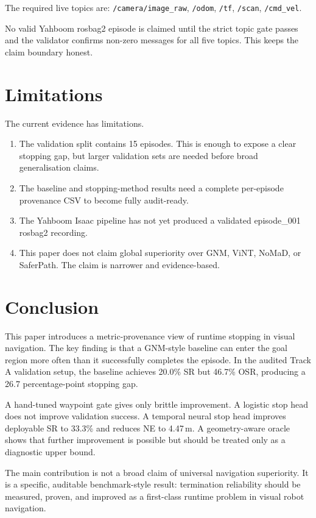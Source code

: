 \documentclass[conference]{IEEEtran}
\begin{document}
The required live topics are: \texttt{/camera/image\_raw}, \texttt{/odom}, \texttt{/tf}, \texttt{/scan}, \texttt{/cmd\_vel}.

No valid Yahboom rosbag2 episode is claimed until the strict topic gate passes and the validator confirms non-zero messages for all five topics. This keeps the claim boundary honest.

\section{Limitations}

The current evidence has limitations.
\begin{enumerate}
    \item The validation split contains 15 episodes. This is enough to expose a clear stopping gap, but larger validation sets are needed before broad generalisation claims.
    \item The baseline and stopping-method results need a complete per-episode provenance CSV to become fully audit-ready.
    \item The Yahboom Isaac pipeline has not yet produced a validated episode\_001 rosbag2 recording.
    \item This paper does not claim global superiority over GNM, ViNT, NoMaD, or SaferPath. The claim is narrower and evidence-based.
\end{enumerate}

\section{Conclusion}

This paper introduces a metric-provenance view of runtime stopping in visual navigation. The key finding is that a GNM-style baseline can enter the goal region more often than it successfully completes the episode. In the audited Track A validation setup, the baseline achieves 20.0\% SR but 46.7\% OSR, producing a 26.7 percentage-point stopping gap.

A hand-tuned waypoint gate gives only brittle improvement. A logistic stop head does not improve validation success. A temporal neural stop head improves deployable SR to 33.3\% and reduces NE to 4.47\,m. A geometry-aware oracle shows that further improvement is possible but should be treated only as a diagnostic upper bound.

The main contribution is not a broad claim of universal navigation superiority. It is a specific, auditable benchmark-style result: termination reliability should be measured, proven, and improved as a first-class runtime problem in visual robot navigation.
\end{document}
